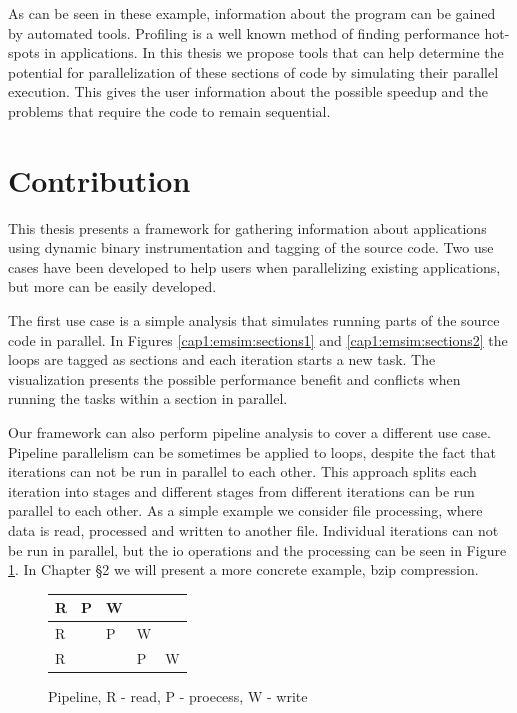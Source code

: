 As can be seen in these example, information about the program can be gained by automated tools. Profiling is a well known method of finding performance hot-spots in applications. In this thesis we propose tools that can help determine the potential for parallelization of these sections of code by simulating their parallel execution. This gives the user information about the possible speedup and the problems that require the code to remain sequential.

\section {Contribution}

This thesis presents a framework for gathering information about applications using dynamic binary instrumentation and tagging of the source code. Two use cases have been developed to help users when parallelizing existing applications, but more can be easily developed.

The first use case is a simple analysis that simulates running parts of the source code in parallel. In Figures \ref{cap1:emsim:sections1} and \ref{cap1:emsim:sections2} the loops are tagged as sections and each iteration starts a new task. The visualization presents the possible performance benefit and conflicts when running the tasks within a section in parallel.

Our framework can also perform pipeline analysis to cover a different use case. Pipeline parallelism can be sometimes be applied to loops, despite the fact that iterations can not be run in parallel to each other. This approach splits each iteration into stages and different stages from different iterations can be run parallel to each other. As a simple example we consider file processing, where data is read, processed and written to another file. Individual iterations can not be run in parallel, but the io operations and the processing can be seen in Figure \ref{cap1:pipeline}. In Chapter §2 we will present a more concrete example, bzip compression.

\begin{figure}[!ht]
	\centering
	\begin{tabular}{ l | l | l | l | l}
		R & P & W & & \\
		\hline
		R &  & P & W & \\
		\hline
		R &  & & P & W \\
	\end{tabular}
	\caption{Pipeline, R - read, P - proecess, W - write}
	\label{cap1:pipeline}
\end{figure}

